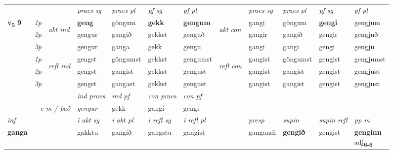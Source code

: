 \begin{longtable}[l]{X>{\footnotesize\itshape}llXXXXlXXXX}
\midrule
 & &   & \textit{praes sg}  & \textit{praes pl}    & \textit{ pf sg} & \textit{pf pl} & & \textit{praes sg}  & \textit{praes pl}    & \textit{pf sg} & \textit{pf pl }  \\ \cmidrule{4-7} \cmidrule{9-12}
 \multirow{2}{*}{{{\textbf{v{\textsubscript{5}}} \Large{\textbf{9}}}}}  & 1p & \multirow{3}{*}{\begin{turn}{90}\textit{akt ind}\end{turn}} & \textbf{geng} & göngum & \textbf{gekk} & \textbf{gengum} & \multirow{3}{*}{\begin{turn}{90}\textit{akt con}\end{turn}} &gangi & göngum & \textbf{gengi} & gengjum\\*
 & 2p &  &  gengur  & gangið & gekkst & genguð & & gangir & gangið & gengir & gengjuð \\*
 & 3p &  & gengur & ganga & gekk & gengu & & gangi & gangi& gengi & gengju \\*
\cmidrule{4-7} \cmidrule{9-12}
 & 1p & \multirow{3}{*}{\begin{turn}{90}\textit{refl ind}\end{turn}}  & gengst & göngumst & gekkst & gengumst & \multirow{3}{*}{\begin{turn}{90}\textit{refl con}\end{turn}}  &gangist & göngumst & gengist & gengjumst \\*
 & 2p &  & gengst & gangist & gekkst & gengust & &gangist & gangist & gengist & gengjust \\*
 & 3p  & & gengst & gangast & gekkst & gengust & & gangist & gangist& gengist & gengjust \\*
\cmidrule{4-7} \cmidrule{9-12}

   && &  \textit{ind praes} & \textit{ind pf} & \textit{con praes} & \textit{con pf} \\*
\multicolumn{3}{r}{\textit{e-m / það}} & gengur & gekk & gangi & gengi \\*

\cmidrule{4-7}
   {\textit{inf}} & &  & \textit{i akt sg} & \textit{i akt pl} & \textit{i refl sg} & \textit{i refl pl} && \textit{presp} & \textit{supin} & \textit{supin refl} & \textit{pp m} \\*
  {\textbf{ganga}} & && gakktu  & gangið & gangstu & gangist && gangandi &  \textbf{gengið} & gengist & \specialcell{\textbf{genginn} \\ adj\textbf{\textsubscript{6-6}}} \\*


\end{longtable}
